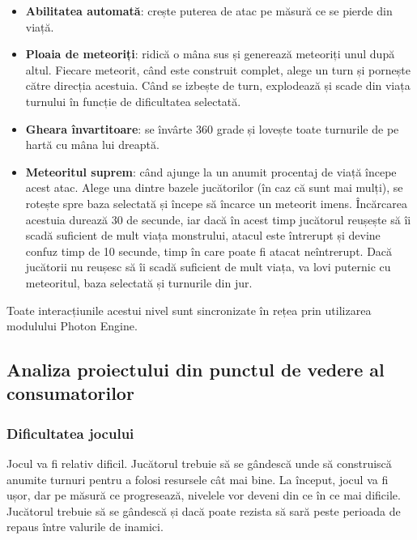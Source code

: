 \documentclass[12pt, a4paper]{article}
\begin{document}
	\begin{itemize}
		\item \textbf{Abilitatea automată}: crește puterea de atac pe măsură ce se pierde din viață.
		\item \textbf{Ploaia de meteoriți}: ridică o mâna sus și generează meteoriți unul după altul. Fiecare meteorit, când este construit complet, alege un turn și pornește către direcția acestuia. Când se izbește de turn, explodează și scade din viața turnului în funcție de dificultatea selectată.
		\item \textbf{Gheara învartitoare}: se învârte 360 grade și lovește toate turnurile de pe hartă cu mâna lui dreaptă.
		\item \textbf{Meteoritul suprem}: când ajunge la un anumit procentaj de viață începe acest atac. Alege una dintre bazele jucătorilor (în caz că sunt mai mulți), se rotește spre baza selectată și începe să încarce un meteorit imens. Încărcarea acestuia durează 30 de secunde, iar dacă în acest timp jucătorul reușește să îi scadă suficient de mult viața monstrului, atacul este întrerupt și devine confuz timp de 10 secunde, timp în care poate fi atacat neîntrerupt. Dacă jucătorii nu reușesc să îi scadă suficient de mult viața, va lovi puternic cu meteoritul, baza selectată și turnurile din jur.
	\end{itemize}
	
	Toate interacțiunile acestui nivel sunt sincronizate în rețea prin utilizarea modulului Photon Engine.
	
	
	
	
	
	\subsection{Analiza proiectului din punctul de vedere al consumatorilor}
	
	\subsubsection{Dificultatea jocului}
	
	Jocul va fi relativ dificil. Jucătorul trebuie să se gândescă unde să construiscă anumite turnuri pentru a folosi resursele cât mai bine. La început, jocul va fi ușor, dar pe măsură ce progresează, nivelele vor deveni din ce în ce mai dificile. Jucătorul trebuie să se gândescă și dacă poate rezista să sară peste perioada de repaus între valurile de inamici.
	\newline
	
\end{document}
